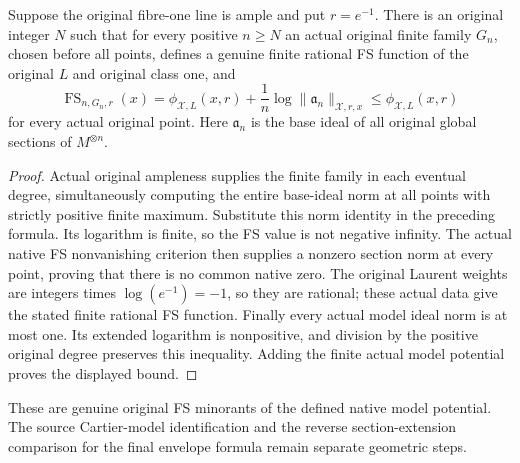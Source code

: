 \begin{theorem}\label{thm:native-tc-original-potential-finite-rational-fs-minorants}
\leanok
Suppose the original fibre-one line is ample and put $r=e^{-1}$.
There is an original integer $N$ such that for every positive
$n\geq N$ an actual original finite family $G_n$, chosen before
all points, defines a genuine finite rational FS function of the
original $L$ and original class one, and
\[
 \operatorname{FS}_{n,G_n,r}(x)
 =\phi_{\mathcal X,L}(x,r)+\frac1n
   \log\lVert\mathfrak a_n\rVert_{\mathcal X,r,x}
 \leq\phi_{\mathcal X,L}(x,r)
\]
for every actual original point. Here $\mathfrak a_n$ is the base
ideal of all original global sections of $M^{\otimes n}$.
\end{theorem}
\begin{proof}
Actual original ampleness supplies the finite family in each eventual
degree, simultaneously computing the entire base-ideal norm at all
points with strictly positive finite maximum. Substitute this norm
identity in the preceding formula. Its logarithm is finite, so the
FS value is not negative infinity. The actual native FS nonvanishing
criterion then supplies a nonzero section norm at every point,
proving that there is no common native zero. The original Laurent
weights are integers times $\log(e^{-1})=-1$, so they are rational;
these actual data give the stated finite rational FS function.
Finally every actual model ideal norm is at most one. Its extended
logarithm is nonpositive, and division by the positive original
degree preserves this inequality. Adding the finite actual model
potential proves the displayed bound.
\end{proof}

\begin{remark}
These are genuine original FS minorants of the defined native model
potential. The source Cartier-model identification and the reverse
section-extension comparison for the final envelope formula remain
separate geometric steps.
\end{remark}
